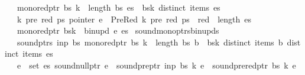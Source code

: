 \begin{isabellebody}
\ \ \ {\isachardoublequoteopen}mono{\isacharunderscore}{\kern0pt}red{\isacharunderscore}{\kern0pt}ptr\ bs{\isachardoublequoteclose}\ {\isachardoublequoteopen}k\ {\isacharless}{\kern0pt}\ length\ bs{\isachardoublequoteclose}\ {\isachardoublequoteopen}es\ {\isacharequal}{\kern0pt}\ bs{\isacharbang}{\kern0pt}k{\isachardoublequoteclose}\ {\isachardoublequoteopen}distinct\ {\isacharparenleft}{\kern0pt}items\ es{\isacharparenright}{\kern0pt}{\isachardoublequoteclose}\isanewline
\ \ \ {\isachardoublequoteopen}{\isasymforall}k{\isacharprime}{\kern0pt}\ pre\ red\ ps{\isachardot}{\kern0pt}\ pointer\ e\ {\isacharequal}{\kern0pt}\ PreRed\ {\isacharparenleft}{\kern0pt}k{\isacharprime}{\kern0pt}{\isacharcomma}{\kern0pt}\ pre{\isacharcomma}{\kern0pt}\ red{\isacharparenright}{\kern0pt}\ ps\ {\isasymlongrightarrow}\ red\ {\isacharless}{\kern0pt}\ length\ es{\isachardoublequoteclose}\isanewline
\ \ \ {\isachardoublequoteopen}mono{\isacharunderscore}{\kern0pt}red{\isacharunderscore}{\kern0pt}ptr\ {\isacharparenleft}{\kern0pt}bs{\isacharbrackleft}{\kern0pt}k\ {\isacharcolon}{\kern0pt}{\isacharequal}{\kern0pt}\ bin{\isacharunderscore}{\kern0pt}upd\ e\ es{\isacharbrackright}{\kern0pt}{\isacharparenright}{\kern0pt}{\isachardoublequoteclose}%
\isadelimproof
%
\endisadelimproof
%
\isatagproof
%
\endisatagproof
{\isafoldproof}%
%
\isadelimproof
\isanewline
%
\endisadelimproof
{}\isamarkupfalse%
\ sound{\isacharunderscore}{\kern0pt}mono{\isacharunderscore}{\kern0pt}ptrs{\isacharunderscore}{\kern0pt}bin{\isacharunderscore}{\kern0pt}upds{\isacharcolon}{\kern0pt}\isanewline
\ \ \ {\isachardoublequoteopen}sound{\isacharunderscore}{\kern0pt}ptrs\ inp\ bs{\isachardoublequoteclose}\ {\isachardoublequoteopen}mono{\isacharunderscore}{\kern0pt}red{\isacharunderscore}{\kern0pt}ptr\ bs{\isachardoublequoteclose}\ {\isachardoublequoteopen}k\ {\isacharless}{\kern0pt}\ length\ bs{\isachardoublequoteclose}\ {\isachardoublequoteopen}b\ {\isacharequal}{\kern0pt}\ bs{\isacharbang}{\kern0pt}k{\isachardoublequoteclose}\ {\isachardoublequoteopen}distinct\ {\isacharparenleft}{\kern0pt}items\ b{\isacharparenright}{\kern0pt}{\isachardoublequoteclose}\ {\isachardoublequoteopen}distinct\ {\isacharparenleft}{\kern0pt}items\ es{\isacharparenright}{\kern0pt}{\isachardoublequoteclose}\isanewline
\ \ \ {\isachardoublequoteopen}{\isasymforall}e\ {\isasymin}\ set\ es{\isachardot}{\kern0pt}\ sound{\isacharunderscore}{\kern0pt}null{\isacharunderscore}{\kern0pt}ptr\ e\ {\isasymand}\ sound{\isacharunderscore}{\kern0pt}pre{\isacharunderscore}{\kern0pt}ptr\ inp\ bs\ k\ e\ {\isasymand}\ sound{\isacharunderscore}{\kern0pt}prered{\isacharunderscore}{\kern0pt}ptr\ bs\ k\ e{\isachardoublequoteclose}\isanewline

\end{isabellebody}
